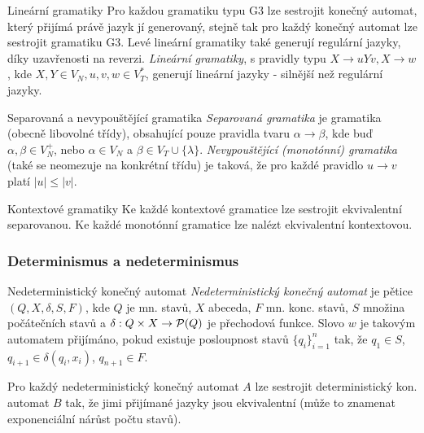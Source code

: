 \begin{poznamkaN}{Lineární gramatiky}
Pro každou gramatiku typu G3 lze sestrojit konečný automat, který přijímá právě jazyk jí generovaný, stejně tak pro každý konečný automat lze sestrojit gramatiku G3. Levé lineární gramatiky také generují regulární jazyky, díky uzavřenosti na reverzi. \emph{Lineární gramatiky}, s pravidly typu $X\to uYv,X\to w$, kde $X,Y\in V_N, u,v,w\in V_T^{\ast}$, generují lineární jazyky - silnější než regulární jazyky.
\end{poznamkaN}

\begin{definiceN}{Separovaná a nevypouštějící gramatika}
\emph{Separovaná gramatika} je gramatika (obecně libovolné třídy), obsahující pouze pravidla tvaru $\alpha\to\beta$, kde buď $\alpha,\beta\in V_N^+$, nebo $\alpha\in V_N$ a $\beta\in V_T\cup\{\lambda\}$. \emph{Nevypouštějící (monotónní) gramatika} (také se neomezuje na konkrétní třídu) je taková, že pro každé pravidlo $u\to v$ platí $|u|\leq|v|$.
\end{definiceN}

\begin{poznamkaN}{Kontextové gramatiky}
Ke každé kontextové gramatice lze sestrojit ekvivalentní separovanou. Ke každé monotónní gramatice lze nalézt ekvivalentní kontextovou.
\end{poznamkaN}


\subsubsection*{Determinismus a nedeterminismus}

\begin{definiceN}{Nedeterministický konečný automat}
\emph{Nedeterministický konečný automat} je pětice $(Q,X,\delta,S,F)$, kde $Q$ je mn. stavů, $X$ abeceda, $F$ mn. konc. stavů, $S$ množina počátečních stavů a $\delta:Q\times X\to \mathcal{P}(Q)$ je přechodová funkce. Slovo $w$ je takovým automatem přijímáno, pokud existuje posloupnost stavů $\{q_i\}_{i=1}^n$ tak, že $q_1\in S$, $q_{i+1}\in\delta(q_i,x_i)$, $q_{n+1}\in F$.
\end{definiceN}

\begin{poznamka}
Pro každý nedeterministický konečný automat $A$ lze sestrojit deterministický kon. automat $B$ tak, že jimi přijímané jazyky jsou ekvivalentní (může to znamenat exponenciální nárůst počtu stavů).
\end{poznamka}


